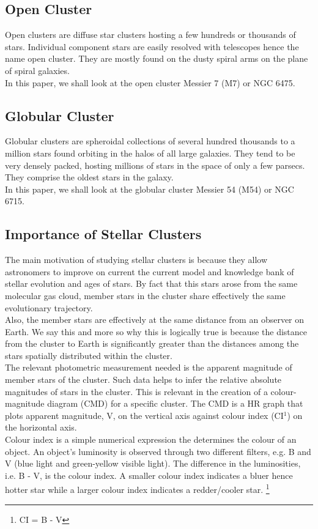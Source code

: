 \documentclass[12pt]{article}
\begin{document}
		\subsection{Open Cluster}
		Open clusters are diffuse star clusters hosting a few hundreds or thousands of stars. Individual component stars are easily resolved with telescopes hence the name open cluster. They are mostly found on the dusty spiral arms on the plane of spiral galaxies.\\
		In this paper, we shall look at the open cluster Messier 7 (M7) or NGC 6475.
		\subsection{Globular Cluster}
		Globular clusters are spheroidal collections of several hundred thousands to a million stars found orbiting in the halos of all large galaxies. They tend to be very densely packed, hosting millions of stars in the space of only a few parsecs. They comprise the oldest stars in the galaxy.\\
		In this paper, we shall look at the globular cluster Messier 54 (M54) or NGC 6715.
		\subsection{Importance of Stellar Clusters}
		The main motivation of studying stellar clusters is because they allow astronomers to improve on current the current model and knowledge bank of stellar evolution and ages of stars. By fact that this stars arose from the same molecular gas cloud, member stars in the cluster share effectively the same evolutionary trajectory.\\
		Also, the member stars are effectively at the same distance from an observer on Earth. We say this and more so why this is logically true is because the distance from the cluster to Earth is significantly greater than the distances among the stars spatially distributed within the cluster.\\
		The relevant photometric measurement needed is the apparent magnitude of member stars of the cluster. Such data helps to infer the relative absolute magnitudes of stars in the cluster. This is relevant in the creation of a colour-magnitude diagram (CMD) for a specific cluster. The CMD is a HR graph that plots apparent magnitude, V, on the vertical axis against colour index (CI$^1$) on the horizontal axis.\\
		Colour index is a simple numerical expression the determines the colour of an object. An object's luminosity is observed through two different filters, e.g. B and V (blue light and green-yellow visible light). The difference in the luminosities, i.e. B - V, is the colour index. A smaller colour index indicates a bluer hence hotter star while a larger colour index indicates a redder/cooler star.
		\footnote{CI = B - V}
	
\end{document}
